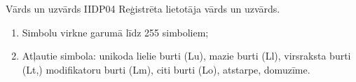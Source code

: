 \parameterTable
{Vārds un uzvārds}
{IIDP04}
{
	Reģistrēta lietotāja vārds un uzvārds.
}
{
	\begin{enumerate}
		\item Simbolu virkne garumā līdz 255 simboliem;
		\item Atļautie simbola: unikoda lielie burti (Lu), mazie burti (Ll), virsraksta burti (Lt,) modifikatoru burti (Lm), citi burti (Lo), atstarpe, domuzīme.
	\end{enumerate}
}
{
}
